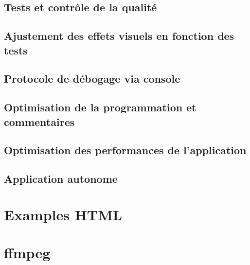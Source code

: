 \documentclass[
]{book}
\begin{document}
\hypertarget{tests-et-contruxf4le-de-la-qualituxe9}{%
\section{Tests et contrôle de la qualité}\label{tests-et-contruxf4le-de-la-qualituxe9}}

\hypertarget{ajustement-des-effets-visuels-en-fonction-des-tests}{%
\section{Ajustement des effets visuels en fonction des tests}\label{ajustement-des-effets-visuels-en-fonction-des-tests}}

\hypertarget{protocole-de-duxe9bogage-via-console}{%
\section{Protocole de débogage via console}\label{protocole-de-duxe9bogage-via-console}}

\hypertarget{optimisation-de-la-programmation-et-commentaires}{%
\section{Optimisation de la programmation et commentaires}\label{optimisation-de-la-programmation-et-commentaires}}

\hypertarget{optimisation-des-performances-de-lapplication}{%
\section{Optimisation des performances de l'application}\label{optimisation-des-performances-de-lapplication}}

\hypertarget{application-autonome}{%
\section{Application autonome}\label{application-autonome}}

\hypertarget{examples-html}{%
\chapter{Examples HTML}\label{examples-html}}

\hypertarget{ffmpeg}{%
\chapter{ffmpeg}\label{ffmpeg}}
\end{document}
